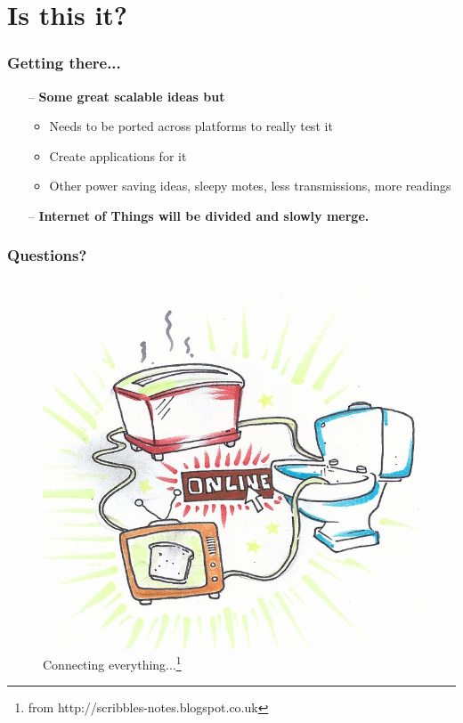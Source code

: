 \documentclass{beamer}
\begin{document}
\section{Is this it?} %
\label{sec:is_this_it_}
\begin{frame}\frametitle{Getting there...}
\begin{itemize}
  \item[--] \textbf{Some great scalable ideas but}
\begin{itemize}
  \item Needs to be ported across platforms to really test it
  \item Create applications for it
  \item Other power saving ideas, sleepy motes, less transmissions, more readings
\end{itemize}
\item [--] \textbf{Internet of Things will be divided and slowly merge.}
  
\end{itemize}


\end{frame}
\begin{frame}[t]\frametitle{Questions?}

\begin{figure}
\includegraphics[scale=0.2]{presentation/img/internet-of-things.jpg}
\caption{Connecting everything...\footnote{from http://scribbles-notes.blogspot.co.uk}}

\end{figure}
\end{frame}
\end{document}

